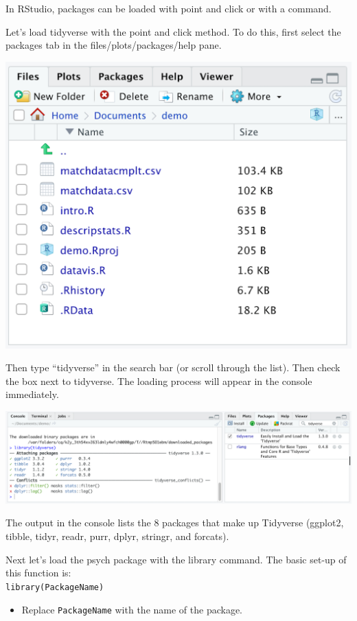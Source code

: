 \documentclass[
]{book}
\providecommand{\tightlist}{%
  \setlength{\itemsep}{0pt}\setlength{\parskip}{0pt}}
\begin{document}
In RStudio, packages can be loaded with point and click or with a command.

Let's load tidyverse with the point and click method. To do this, first select the packages tab in the files/plots/packages/help pane.

\includegraphics{img/NAVIGATING AND COMMANDS R116.png}

Then type ``tidyverse'' in the search bar (or scroll through the list). Then check the box next to tidyverse. The loading process will appear in the console immediately.

\includegraphics{img/NAVIGATING AND COMMANDS R117.png}

The output in the console lists the 8 packages that make up Tidyverse (ggplot2, tibble, tidyr, readr, purr, dplyr, stringr, and forcats).

Next let's load the psych package with the library command. The basic set-up of this function is:\\
\texttt{library(PackageName)}

\begin{itemize}
\tightlist
\item
  Replace \texttt{PackageName} with the name of the package.
\end{itemize}
\end{document}
